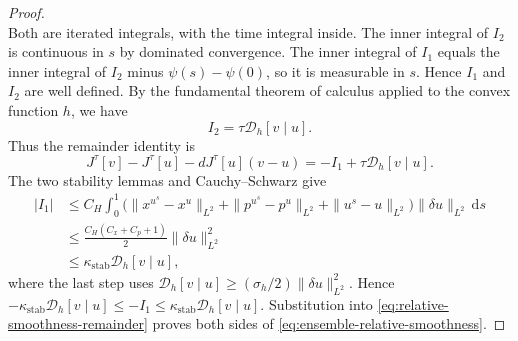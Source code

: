 \documentclass[10pt,a4paper]{amsart}
\newcommand{\dd}{\mathrm{d}}
\begin{document}
\begin{proof}
\[\]
Both are iterated integrals, with the time integral inside. The
inner integral of $I_2$ is continuous in $s$ by dominated convergence.
The inner integral of $I_1$ equals the inner integral of $I_2$ minus
$\psi(s)-\psi(0)$, so it is measurable in $s$. Hence $I_1$ and $I_2$
are well defined.
By the fundamental theorem of calculus applied to the convex function $h$, we have
\[
I_2 =\tau\mathcal D_h[v\mid u].
\]
Thus the remainder identity is
\begin{equation}
\label{eq:relative-smoothness-remainder}
J^\tau[v]-J^\tau[u]-dJ^\tau[u](v-u)
=-I_1+\tau\mathcal D_h[v\mid u].
\end{equation}
The two stability lemmas and Cauchy--Schwarz give
\begin{align*}
|I_1|&\le C_H\int_0^1
\bigl(\|x^{u^s}-x^u\|_{L^2}+\|p^{u^s}-p^u\|_{L^2}
+\|u^s-u\|_{L^2}\bigr)\|\delta u\|_{L^2}\,\dd s\\
&\le\frac{C_H(C_x+C_p+1)}2\|\delta u\|_{L^2}^2\\
&\le\kappa_{\mathrm{stab}}\mathcal D_h[v\mid u],
\end{align*}
where the last step uses
$\mathcal D_h[v\mid u]\ge(\sigma_h/2)\|\delta u\|_{L^2}^2$.
Hence $-\kappa_{\mathrm{stab}}\mathcal D_h[v\mid u]\le-I_1
\le\kappa_{\mathrm{stab}}\mathcal D_h[v\mid u]$.
Substitution into \eqref{eq:relative-smoothness-remainder} proves both
sides of \eqref{eq:ensemble-relative-smoothness}.
\end{proof}
\end{document}
